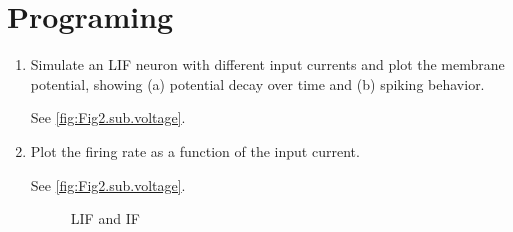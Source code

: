 \documentclass[11pt]{article}
\begin{document}
\begin{enumerate}
	\end{enumerate}
	
	\section*{Programing}
	\begin{enumerate}
		\item Simulate an LIF neuron with different input currents and plot the membrane potential, showing (a) potential decay over time and (b) spiking behavior.

		See \ref{fig:Fig2.sub.voltage}.
		
		\item Plot the firing rate as a function of the input current.
		
		See \ref{fig:Fig2.sub.voltage}.
		
		\begin{figure}[ht]
			\centering
			\caption{LIF and IF}
		\end{figure}
		

\end{enumerate}
\end{document}
